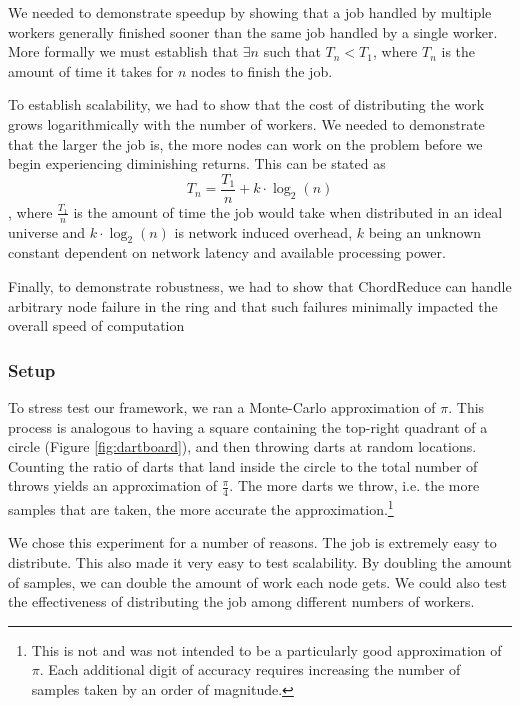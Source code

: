 We needed to demonstrate speedup by showing that a job handled by multiple workers generally finished sooner than the same job handled by a single worker.  
More formally we must establish that $\exists n$ such that $T_{n} < T_{1}$, where $T_{n}$ is the amount of time it takes for $n$ nodes to finish the job.

To establish scalability, we had to show that the cost of distributing the work grows logarithmically with the number of workers.  
We needed to demonstrate that the larger the job is, the more nodes can work on the problem before we begin experiencing diminishing returns. 
This can be stated as $$T_{n} = \frac{T_{1}}{n} + k \cdot \log_{2}(n)$$, where $\frac{T_{1}}{n}$ is the amount of time the job would take when distributed in an ideal universe and $k \cdot \log_{2}(n)$ is network induced overhead, $k$ being an unknown constant dependent on network latency and available processing power.

Finally, to demonstrate robustness, we had to show that ChordReduce can handle arbitrary node failure in the ring and that such failures minimally impacted the overall speed of computation

\subsubsection{Setup}


To stress test our framework, we ran a Monte-Carlo approximation of $\pi$. 
This process is analogous to having a square containing  the top-right quadrant of a circle (Figure \ref{fig:dartboard}), and then throwing darts at random locations.  
Counting the ratio of darts that land inside the circle to the total number of throws yields an approximation of $\frac{\pi}{4}$.  
The more darts we throw, i.e. the more samples that are taken, the more accurate the approximation.\footnote{This is not and was not intended to be a particularly good approximation of $\pi$.
Each additional digit of accuracy requires increasing the number of samples taken by an order of magnitude.}


We chose this experiment for a number of reasons. 
The job is extremely easy to distribute.  
This also made it very easy to test scalability. 
By doubling the amount of samples, we can double the amount of work each node gets.  
We could also test the effectiveness of distributing the job among different numbers of workers.



